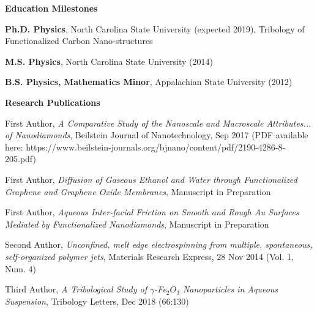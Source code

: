 \documentclass[letterpaper,final]{memoir}
\newcommand{\Sep}{\vspace{1.0em}}
\newcommand{\SmallSep}{\vspace{0.4em}}
\newcommand{\CVSection}[1]
	{\LARGE\textbf{#1}\par
	\SmallSep\normalsize}
\begin{document}
\newpage

\notoserif \CVSection{Education Milestones}
\normalfont
\Sep
\begin{compactitem}[\color{Blue}$\circ$]

\item \textbf{Ph.D. Physics}, North Carolina State University (expected 2019), Tribology of Functionalized Carbon Nano-structures
\SmallSep

\item \textbf{M.S. Physics}, North Carolina State University (2014)
\SmallSep

\item \textbf{B.S. Physics, Mathematics Minor}, Appalachian State University (2012)

\end{compactitem}
\Sep



\notoserif \CVSection{Research Publications}
\normalfont

\SmallSep

\begin{compactitem}[\color{Blue}$\circ$]
	 
    \item First Author, \textit{A Comparative Study of the Nanoscale and Macroscale Attributes... of Nanodiamonds}, Beilstein Journal of Nanotechnology, Sep 2017 (PDF available here: https://www.beilstein-journals.org/bjnano/content/pdf/2190-4286-8-205.pdf)
    \SmallSep

    \item First Author, \textit{Diffusion of Gaseous Ethanol and Water through Functionalized Graphene and Graphene Oxide Membranes}, Manuscript in Preparation
    \SmallSep

    \item First Author, \textit{Aqueous Inter-facial Friction on Smooth and Rough Au Surfaces Mediated by Functionalized Nanodiamonds}, Manuscript in Preparation
    \SmallSep
    
    \item Second Author, \textit{Unconfined, melt edge electrospinning from multiple, spontaneous, self-organized polymer jets}, Materials Research Express, 28 Nov 2014 (Vol. 1, Num. 4)
    \SmallSep

    \item Third Author, \textit{A Tribological Study of $\gamma$-Fe$_{2}O_{3}$ Nanoparticles in Aqueous Suspension}, Tribology Letters, Dec 2018 (66:130)
	
\end{compactitem}
\end{document}
